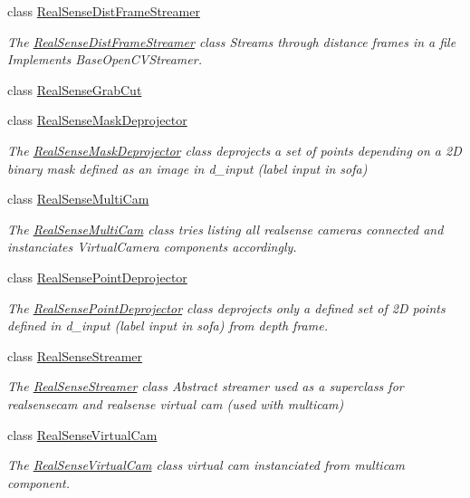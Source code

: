 \begin{DoxyCompactItemize}
class \hyperlink{classsofa_1_1rgbdtracking_1_1_real_sense_dist_frame_streamer}{Real\+Sense\+Dist\+Frame\+Streamer}
\begin{DoxyCompactList}\small\item\em The \hyperlink{classsofa_1_1rgbdtracking_1_1_real_sense_dist_frame_streamer}{Real\+Sense\+Dist\+Frame\+Streamer} class Streams through distance frames in a file Implements Base\+Open\+C\+V\+Streamer. \end{DoxyCompactList}\item 
class \hyperlink{classsofa_1_1rgbdtracking_1_1_real_sense_grab_cut}{Real\+Sense\+Grab\+Cut}
\item 
class \hyperlink{classsofa_1_1rgbdtracking_1_1_real_sense_mask_deprojector}{Real\+Sense\+Mask\+Deprojector}
\begin{DoxyCompactList}\small\item\em The \hyperlink{classsofa_1_1rgbdtracking_1_1_real_sense_mask_deprojector}{Real\+Sense\+Mask\+Deprojector} class deprojects a set of points depending on a 2D binary mask defined as an image in d\+\_\+input (label input in sofa) \end{DoxyCompactList}\item 
class \hyperlink{classsofa_1_1rgbdtracking_1_1_real_sense_multi_cam}{Real\+Sense\+Multi\+Cam}
\begin{DoxyCompactList}\small\item\em The \hyperlink{classsofa_1_1rgbdtracking_1_1_real_sense_multi_cam}{Real\+Sense\+Multi\+Cam} class tries listing all realsense cameras connected and instanciates Virtual\+Camera components accordingly. \end{DoxyCompactList}\item 
class \hyperlink{classsofa_1_1rgbdtracking_1_1_real_sense_point_deprojector}{Real\+Sense\+Point\+Deprojector}
\begin{DoxyCompactList}\small\item\em The \hyperlink{classsofa_1_1rgbdtracking_1_1_real_sense_point_deprojector}{Real\+Sense\+Point\+Deprojector} class deprojects only a defined set of 2D points defined in d\+\_\+input (label input in sofa) from depth frame. \end{DoxyCompactList}\item 
class \hyperlink{classsofa_1_1rgbdtracking_1_1_real_sense_streamer}{Real\+Sense\+Streamer}
\begin{DoxyCompactList}\small\item\em The \hyperlink{classsofa_1_1rgbdtracking_1_1_real_sense_streamer}{Real\+Sense\+Streamer} class Abstract streamer used as a superclass for realsensecam and realsense virtual cam (used with multicam) \end{DoxyCompactList}\item 
class \hyperlink{classsofa_1_1rgbdtracking_1_1_real_sense_virtual_cam}{Real\+Sense\+Virtual\+Cam}
\begin{DoxyCompactList}\small\item\em The \hyperlink{classsofa_1_1rgbdtracking_1_1_real_sense_virtual_cam}{Real\+Sense\+Virtual\+Cam} class virtual cam instanciated from multicam component. \end{DoxyCompactList}\end{DoxyCompactItemize}

